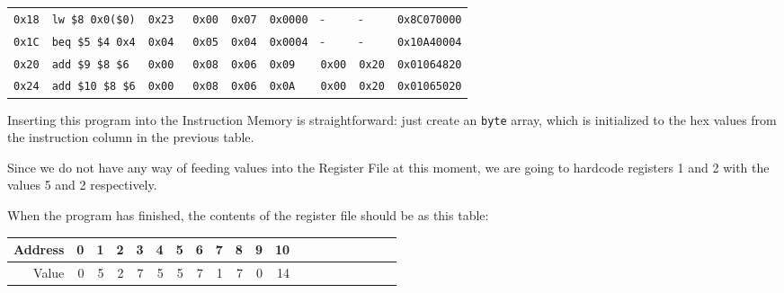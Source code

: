\documentclass{beamer}
\begin{document}
\begin{frame}
\begin{center}
{\begin{tabular}{rllllllll}
                \texttt{0x18} & \texttt{lw \$8  0x0(\$0)} & \texttt{0x23} &
                \texttt{0x00} & \texttt{0x07} & \texttt{0x0000} & - &
                - & \texttt{0x8C070000} \\ %

                \texttt{0x1C} & \texttt{beq \$5 \$4 0x4} & \texttt{0x04} &
                \texttt{0x05} & \texttt{0x04} & \texttt{0x0004} & - &
                - & \texttt{0x10A40004} \\ %

                \texttt{0x20} & \texttt{add \$9 \$8 \$6} & \texttt{0x00} &
                \texttt{0x08} & \texttt{0x06} & \texttt{0x09} & \texttt{0x00} &
                \texttt{0x20} & \texttt{0x01064820} \\ %

                \texttt{0x24} & \texttt{add \$10 \$8 \$6} & \texttt{0x00} &
                \texttt{0x08} & \texttt{0x06} & \texttt{0x0A} & \texttt{0x00} &
                \texttt{0x20} & \texttt{0x01065020} \\ %
                \hline
            \end{tabular}
        }
    \end{center}
\end{frame}
\begin{frame}
    Inserting this program into the Instruction Memory is straightforward: just
    create an \texttt{byte} array, which is initialized to the hex values from
    the instruction column in the previous table.

    \vspace{\baselineskip}
    Since we do not have any way of feeding values into the Register File at
    this moment, we are going to hardcode registers 1 and 2 with the values 5
    and 2 respectively.
\end{frame}
\begin{frame}
    When the program has finished, the contents of the register file should be
    as this table:
    \begin{table}
        \centering
        \begin{tabular}{rrrrrrrrrrrrrrrrrrrr}
            \hline
            Address & 0 & 1 & 2 & 3 & 4 & 5 & 6 & 7 & 8 & 9 & 10 \\
            \hline
            Value & 0 & 5 & 2 & 7 & 5 & 5 & 7 & 1 & 7 & 0 & 14 \\
            \hline
        \end{tabular}
    \end{table}
\end{frame}
\end{document}
